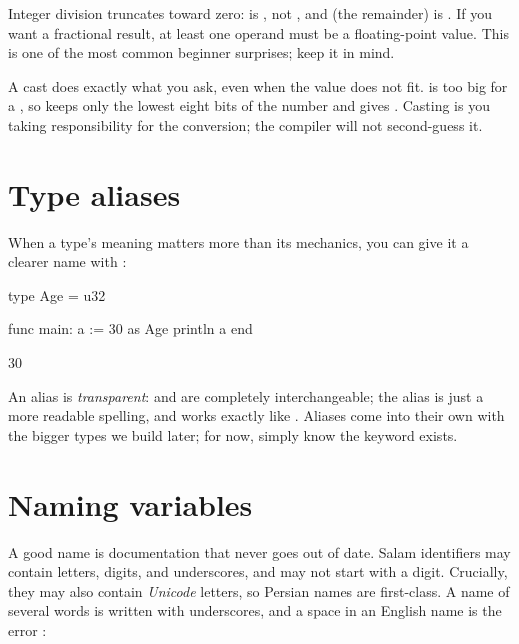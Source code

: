 \begin{warn}
Integer division truncates toward zero:  is , not
, and  (the remainder) is . If you want a
fractional result, at least one operand must be a floating-point value. This is
one of the most common beginner surprises; keep it in mind.
\end{warn}

\begin{note}
A cast does exactly what you ask, even when the value does not fit. 
is too big for a , so  keeps only the lowest eight bits
of the number and gives . Casting is you taking responsibility for the
conversion; the compiler will not second-guess it.
\end{note}

\section{Type aliases}

When a type's meaning matters more than its mechanics, you can give it a clearer
name with :

\begin{salamen}
type Age = u32

func main:
    a := 30 as Age
    println a
end
\end{salamen}

\begin{progout}
30
\end{progout}

An alias is \emph{transparent}:  and  are completely
interchangeable; the alias is just a more readable spelling, and 
works exactly like . Aliases come into their own with the bigger
types we build later; for now, simply know the keyword exists.

\section{Naming variables}

A good name is documentation that never goes out of date. Salam identifiers may
contain letters, digits, and underscores, and may not start with a digit.
Crucially, they may also contain \emph{Unicode} letters, so Persian names are
first-class. A name of several words is written with underscores, and a space
in an English name is the error :

